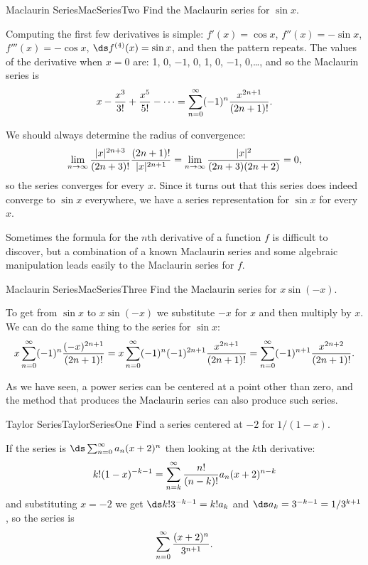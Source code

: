 \begin{example}{Maclaurin Series}{MacSeriesTwo}
Find the Maclaurin series for $\sin x$.
\end{example}
\begin{solution}
Computing the first few derivatives is simple: $f'(x)=\cos x$, $f''(x)=-\sin x$,
$f'''(x)=-\cos x$, $\ds f^{(4)}(x)=\sin x$, and then the pattern
repeats. The values of the derivative when $x=0$ are:
1, 0, $-1$, 0, 1, 0, $-1$, 0,\dots, and so the Maclaurin series is
\[
  x-{x^3\over 3!}+{x^5\over 5!}-\cdots=
  \sum_{n=0}^\infty (-1)^n{x^{2n+1}\over (2n+1)!}.
\]

We should always determine the radius of convergence:
\[
  \lim_{n\to\infty} {|x|^{2n+3}\over (2n+3)!}{(2n+1)!\over |x|^{2n+1}}
  =\lim_{n\to\infty} {|x|^2\over (2n+3)(2n+2)}=0,
\]
so the series converges for every $x$. Since it turns out that this
series does indeed converge to $\sin x$ everywhere, we have a series
representation for $\sin x$ for every $x$.
\end{solution}

Sometimes the formula for the $n$th derivative of a function $f$ is
difficult to discover, but a combination of a known Maclaurin series
and some algebraic manipulation leads easily to the Maclaurin series
for $f$.

\begin{example}{Maclaurin Series}{MacSeriesThree}
Find the Maclaurin series for $x\sin(-x)$.
\end{example}
\begin{solution}
To get from $\sin x$ to $x\sin(-x)$ we substitute $-x$ for $x$ and
then multiply by $x$. We can do the same thing to the series for $\sin
x$:
\[
  x\sum_{n=0}^\infty (-1)^n{(-x)^{2n+1}\over (2n+1)!}
  =x\sum_{n=0}^\infty (-1)^{n}(-1)^{2n+1}{x^{2n+1}\over (2n+1)!}
  =\sum_{n=0}^\infty (-1)^{n+1}{x^{2n+2}\over (2n+1)!}.
\]
\end{solution}

As we have seen, a power series can be centered at a point
other than zero, and the method that produces the Maclaurin series can
also produce such series.

\begin{example}{Taylor Series}{TaylorSeriesOne}
Find a series centered at $-2$ for $1/(1-x)$.
\end{example}
\begin{solution}
If the series is $\ds\sum_{n=0}^\infty a_n(x+2)^n$ then looking at the
$k$th derivative:
$$k!(1-x)^{-k-1}=\sum_{n=k}^\infty {n!\over (n-k)!}a_n(x+2)^{n-k}$$
and substituting $x=-2$ we get
$\ds k!3^{-k-1}=k!a_k$ and $\ds a_k=3^{-k-1}=1/3^{k+1}$, so the series is
$$\sum_{n=0}^\infty {(x+2)^n\over 3^{n+1}}.$$
\end{solution}

